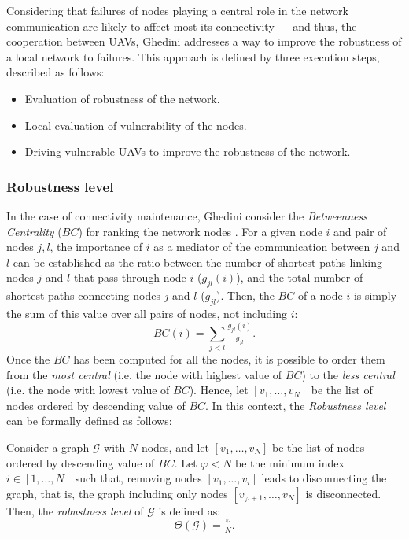 Considering that failures of nodes playing a central role in the network communication are likely to affect most its connectivity --- and thus, the cooperation between UAVs, Ghedini \cite{ghedini_2016} addresses a way to improve the robustness of a local network to failures. This approach is defined by three execution steps, described as follows:

\begin{itemize}
    \item Evaluation of robustness of the network.
    \item Local evaluation of vulnerability of the nodes.
    \item Driving vulnerable UAVs to improve the robustness of the network.
\end{itemize}

\subsubsection{Robustness level}

In the case of connectivity maintenance, Ghedini \cite{ghedini_2015} consider the \emph{Betweenness Centrality} ($BC$) for ranking the network nodes \cite{wasserman_1994}. For a given node $i$ and pair of nodes $j,l$, the importance of $i$ as a mediator of the communication between $j$ and $l$ can be established as the ratio between the number of shortest paths linking nodes $j$ and $l$ that pass through node $i$  ($g_{jl}(i)$), and the total number of shortest paths connecting nodes $j$ and $l$ ($g_{jl}$). Then, the $BC$ of a node $i$ is simply the sum of this value over all pairs of nodes, not including $i$:
\begin{equation} \label{eq:BC}
BC(i) = \sum_{j<l}\tfrac{g_{jl}(i)}{g_{jl}}.
\end{equation}
Once the $BC$ has been computed for all the nodes, it is possible to order them from the \emph{most central} (i.e. the node with highest value of $BC$) to the \emph{less central} (i.e. the node with lowest value of $BC$). Hence, let $\left[v_1, \ldots, v_N\right]$ be the list of nodes ordered by descending value of $BC$. In this context, the \emph{Robustness level} can be formally defined as follows:
 \begin{defn}\label{robustness_level}
Consider a graph $\mathcal{G}$ with $N$ nodes, and let  $\left[v_1, \ldots, v_N\right]$ be the list of nodes ordered by descending value of $BC$. Let $\varphi <N$ be the minimum index $i \in \left[ 1, \ldots, N\right]$ such that, removing nodes $\left[v_1, \ldots, v_i\right]$ leads to disconnecting the graph, that is, the graph including only nodes $\left[v_{\varphi+1}, \ldots, v_N\right]$ is disconnected.
Then, the \emph{robustness level} of $\mathcal{G}$ is defined as:
\begin{equation} \label{eq:robustness}
    \Theta(\mathcal{G}) =  \tfrac{\varphi}{N}.
\end{equation}
\end{defn}

